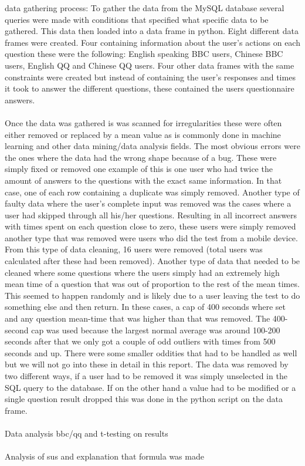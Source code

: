 data gathering process:
To gather the data from the MySQL database several queries were made with conditions that specified what specific data to be gathered. This data then loaded into a data frame in python. Eight different data frames were created. Four containing information about the user's actions on each question these were the following: English speaking BBC users,  Chinese BBC users,  English QQ and Chinese QQ users. Four other data frames with the same constraints were created but instead of containing the user's responses and times it took to answer the different questions, these contained the users questionnaire answers.
\\\\
Once the data was gathered is was scanned for irregularities these were often either removed or replaced by a mean value as is commonly done in machine learning and other data mining/data analysis fields. The most obvious errors were the ones where the data had the wrong shape because of a bug. These were simply fixed or removed one example of this is one user who had twice the amount of answers to the questions with the exact same information. In that case, one of each row containing a duplicate was simply removed. Another type of faulty data where the user's complete input was removed was the cases where a user had skipped through all his/her questions. Resulting in all incorrect answers with times spent on each question close to zero, these users were simply removed another type that was removed were users who did the test from a mobile device. From this type of data cleaning, 16 users were removed (total users was calculated after these had been removed). Another type of data that needed to be cleaned where some questions where the users simply had an extremely high mean time of a question that was out of proportion to the rest of the mean times. This seemed to happen randomly and is likely due to a user leaving the test to do something else and then return. In these cases, a cap of 400 seconds where set and any question mean-time that was higher than that was removed. The 400-second cap was used because the largest normal average was around 100-200 seconds after that we only got a couple of odd outliers with times from 500 seconds and up. There were some smaller oddities that had to be handled as well but we will not go into these in detail in this report. The data was removed by two different ways, if a user had to be removed it was simply unselected in the SQL query to the database. If on the other hand a value had to be modified or a single question result dropped this was done in the python script on the data frame.
\\\\
Data analysis bbc/qq and t-testing on results
\\\\
Analysis of sus and explanation that formula was made


